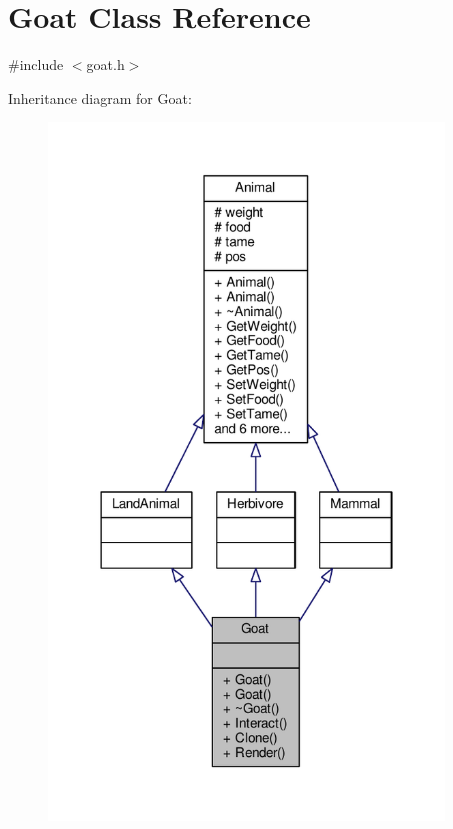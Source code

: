 \hypertarget{classGoat}{}\section{Goat Class Reference}
\label{classGoat}


{\ttfamily \#include $<$goat.\+h$>$}



Inheritance diagram for Goat\+:
\nopagebreak
\begin{figure}[H]
\begin{center}
\leavevmode
\includegraphics[width=298pt]{classGoat__inherit__graph}
\end{center}
\end{figure}


